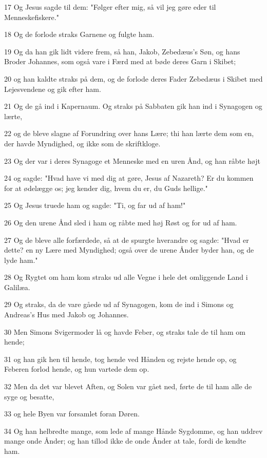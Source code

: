\par 17 Og Jesus sagde til dem: "Følger efter mig, så vil jeg gøre eder til Menneskefiskere."
\par 18 Og de forlode straks Garnene og fulgte ham.
\par 19 Og da han gik lidt videre frem, så han, Jakob, Zebedæus's Søn, og hans Broder Johannes, som også vare i Færd med at bøde deres Garn i Skibet;
\par 20 og han kaldte straks på dem, og de forlode deres Fader Zebedæus i Skibet med Lejesvendene og gik efter ham.
\par 21 Og de gå ind i Kapernaum. Og straks på Sabbaten gik han ind i Synagogen og lærte,
\par 22 og de bleve slagne af Forundring over hans Lære; thi han lærte dem som en, der havde Myndighed, og ikke som de skriftkloge.
\par 23 Og der var i deres Synagoge et Menneske med en uren Ånd, og han råbte højt
\par 24 og sagde: "Hvad have vi med dig at gøre, Jesus af Nazareth? Er du kommen for at ødelægge os; jeg kender dig, hvem du er, du Guds hellige."
\par 25 Og Jesus truede ham og sagde: "Ti, og far ud af ham!"
\par 26 Og den urene Ånd sled i ham og råbte med høj Røst og for ud af ham.
\par 27 Og de bleve alle forfærdede, så at de spurgte hverandre og sagde: "Hvad er dette? en ny Lære med Myndighed; også over de urene Ånder byder han, og de lyde ham."
\par 28 Og Rygtet om ham kom straks ud alle Vegne i hele det omliggende Land i Galilæa.
\par 29 Og straks, da de vare gåede ud af Synagogen, kom de ind i Simons og Andreas's Hus med Jakob og Johannes.
\par 30 Men Simons Svigermoder lå og havde Feber, og straks tale de til ham om hende;
\par 31 og han gik hen til hende, tog hende ved Hånden og rejste hende op, og Feberen forlod hende, og hun vartede dem op.
\par 32 Men da det var blevet Aften, og Solen var gået ned, førte de til ham alle de syge og besatte,
\par 33 og hele Byen var forsamlet foran Døren.
\par 34 Og han helbredte mange, som lede af mange Hånde Sygdomme, og han uddrev mange onde Ånder; og han tillod ikke de onde Ånder at tale, fordi de kendte ham.
